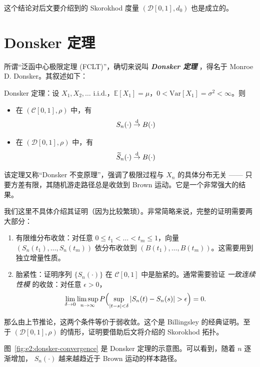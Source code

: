 这个结论对后文要介绍到的 Skorokhod 度量 $(\mathcal D[0,1],d_0)$ 也是成立的。

\section{Donsker 定理}

所谓``泛函中心极限定理 (FCLT)''，确切来说叫 \textbf{\emph{Donsker 定理}} ，得名于 Monroe D. Donsker。其叙述如下：

\begin{theorem}

Donsker 定理：设 $X_1, X_2, \dots$ i.i.d.，$\mathbb{E}[X_1] = \mu$，$0 < \mathrm{Var}[X_1] = \sigma^2 < \infty$。则

\begin{itemize}
\tightlist
\item
  在 $(\mathcal{C}[0,1],\rho)$ 中，有 \[S_n(\cdot) \overset{\rm d}\to B({\cdot})\]\item
  在 $(\mathcal{D}[0,1],\rho)$ 中，有 \[\widetilde S_n(\cdot) \overset{\rm d}\to B(\cdot)\]\end{itemize}
\end{theorem}

该定理又称``Donsker 不变原理''，强调了极限过程与 $X_n$ 的具体分布无关 ------ 只要方差有限，其随机游走路径总是收敛到 Brown 运动。它是一个非常强大的结果。

我们这里不具体介绍其证明（因为比较繁琐）。非常简略来说，完整的证明需要两大部分：

\begin{enumerate}
\def\labelenumi{\arabic{enumi}.}
\tightlist
\item
  有限维分布收敛：对任意 $0 \le t_1 < \dots < t_m \le 1$，向量 $(S_n(t_1), \dots, S_n(t_m))$ 依分布收敛到 $(B(t_1), \dots, B(t_m))$。这需要用到独立增量性质。
\item
  胎紧性：证明序列 $\{S_n(\cdot)\}$ 在 $\mathcal{C}[0,1]$ 中是胎紧的。通常需要验证 \emph{一致连续性模} 的收敛：对任意 $\epsilon > 0$，
  \[
  \lim_{\delta \to 0} \limsup_{n\to\infty} P\Bigl( \sup_{|t-s|<\delta} |S_n(t)-S_n(s)| > \epsilon \Bigr) = 0.
  \]
\end{enumerate}

那么由上节推论，这两个条件等价于弱收敛。这个是 Billingsley 的经典证明。至于 $(\mathcal{D}[0,1],\rho)$ 的情形，证明要借助后文将介绍的 Skorokhod 拓扑。

图~\ref{fig:e2:donsker-convergence} 是 Donsker 定理的示意图。可以看到，随着 $n$ 逐渐增加， $S_n(\cdot)$ 越来越趋近于 Brown 运动的样本路径。

